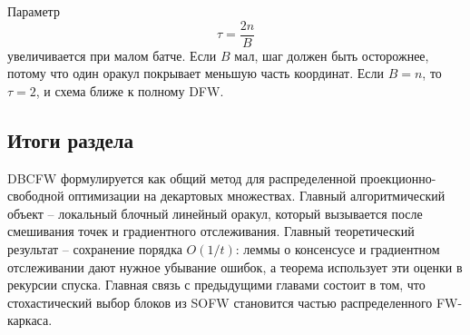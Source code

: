 Параметр
\[
    \tau=\frac{2n}{B}
\]
увеличивается при малом батче.
Если $B$ мал, шаг должен быть осторожнее, потому что один оракул покрывает меньшую часть
координат.
Если $B=n$, то $\tau=2$, и схема ближе к полному DFW.

\subsection{Итоги раздела}

DBCFW формулируется как общий метод для распределенной проекционно-свободной
оптимизации на декартовых множествах.
Главный алгоритмический объект -- локальный блочный линейный оракул, который вызывается
после смешивания точек и градиентного отслеживания.
Главный теоретический результат -- сохранение порядка $O(1/t)$: леммы о консенсусе и
градиентном отслеживании дают нужное убывание ошибок, а теорема использует эти оценки
в рекурсии спуска.
Главная связь с предыдущими главами состоит в том, что стохастический выбор блоков из SOFW
становится частью распределенного FW-каркаса.
